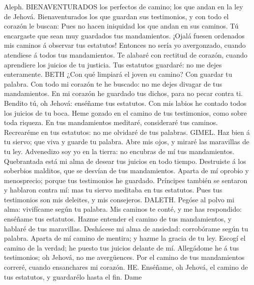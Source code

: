  Aleph. BIENAVENTURADOS los perfectos de camino; los que
andan en la ley de Jehová.  Bienaventurados los que guardan
sus testimonios, y con todo el corazón le buscan:  Pues no
hacen iniquidad los que andan en sus caminos.  Tú encargaste
que sean muy guardados tus mandamientos.  ¡Ojalá fuesen
ordenados mis caminos á observar tus estatutos!  Entonces no
sería yo avergonzado, cuando atendiese á todos tus mandamientos.
 Te alabaré con rectitud de corazón, cuando aprendiere los
juicios de tu justicia.  Tus estatutos guardaré: no me dejes
enteramente.  BETH ¿Con qué limpiará el joven su camino? Con
guardar tu palabra.  Con todo mi corazón te he buscado: no
me dejes divagar de tus mandamientos.  En mi corazón he
guardado tus dichos, para no pecar contra ti.  Bendito tú,
oh Jehová: enséñame tus estatutos.  Con mis labios he
contado todos los juicios de tu boca.  Heme gozado en el
camino de tus testimonios, como sobre toda riqueza.  En tus
mandamientos meditaré, consideraré tus caminos.  Recrearéme
en tus estatutos: no me olvidaré de tus palabras.  GIMEL.
Haz bien á tu siervo; que viva y guarde tu palabra.  Abre
mis ojos, y miraré las maravillas de tu ley.  Advenedizo
soy yo en la tierra: no encubras de mí tus mandamientos. 
Quebrantada está mi alma de desear tus juicios en todo tiempo.
 Destruiste á los soberbios malditos, que se desvían de tus
mandamientos.  Aparta de mí oprobio y menosprecio; porque
tus testimonios he guardado.  Príncipes también se sentaron
y hablaron contra mí: mas tu siervo meditaba en tus estatutos.
 Pues tus testimonios son mis deleites, y mis consejeros.
 DALETH. Pegóse al polvo mi alma: vivifícame según tu
palabra.  Mis caminos te conté, y me has respondido:
enséñame tus estatutos.  Hazme entender el camino de tus
mandamientos, y hablaré de tus maravillas.  Deshácese mi
alma de ansiedad: corrobórame según tu palabra.  Aparta de
mí camino de mentira; y hazme la gracia de tu ley.  Escogí
el camino de la verdad; he puesto tus juicios delante de mí.
 Allegádome he á tus testimonios; oh Jehová, no me
avergüences.  Por el camino de tus mandamientos correré,
cuando ensanchares mi corazón.  HE. Enséñame, oh Jehová, el
camino de tus estatutos, y guardarélo hasta el fin.  Dame
